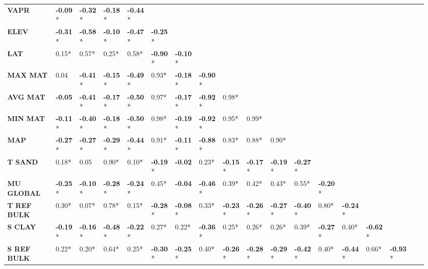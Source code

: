 \documentclass[AutoFakeBold]{LZUThesis-PgD&PhD}
\begin{document}
\begin{table}[H]
\begin{tabular}{p{1.6cm}p{0.68cm}p{0.68cm}p{0.68cm}p{0.68cm}p{0.68cm}p{0.68cm}p{0.68cm}p{0.68cm}p{0.68cm}p{0.68cm}p{0.68cm}p{0.68cm}p{0.68cm}p{0.68cm}p{0.68cm}p{0.68cm}p{0.68cm}}
			\textbf{VAPR} & \textbf{-0.09}* & \textbf{-0.32}* & \textbf{-0.18}* & \textbf{-0.44}* &  &  &  &  &  &  &  &  &  &  &  &  &  \\
			\textbf{ELEV} & \textbf{-0.31}* & \textbf{-0.58}* & \textbf{-0.10}* & \textbf{-0.47}* & \textbf{-0.25}* &  &  &  &  &  &  &  &  &  &  &  &  \\
			\textbf{LAT} & 0.15* & 0.57* & 0.25* & 0.58* & \textbf{-0.90}* & \textbf{-0.10}* &  &  &  &  &  &  &  &  &  &  &  \\
			\textbf{MAX MAT} & 0.04 & \textbf{-0.41}* & \textbf{-0.15}* & \textbf{-0.49}* & 0.93* & \textbf{-0.18}* & \textbf{-0.90}* &  &  &  &  &  &  &  &  &  &  \\
			\textbf{AVG MAT} & \textbf{-0.05} & \textbf{-0.41}* & \textbf{-0.17}* & \textbf{-0.50}* & 0.97* & \textbf{-0.17}* & \textbf{-0.92}* & 0.98* &  &  &  &  &  &  &  &  &  \\
			\textbf{MIN MAT} & \textbf{-0.11}* & \textbf{-0.40}* & \textbf{-0.18}* & \textbf{-0.50}* & 0.98* & \textbf{-0.19}* & \textbf{-0.92}* & 0.95* & 0.99* &  &  &  &  &  &  &  &  \\
			\textbf{MAP} & \textbf{-0.27}* & \textbf{-0.27}* & \textbf{-0.29}* & \textbf{-0.44}* & 0.91* & \textbf{-0.11}* & \textbf{-0.88}* & 0.83* & 0.88* & 0.90* &  &  &  &  &  &  &  \\
			\textbf{T SAND} & 0.18* & 0.05 & 0.90* & 0.10* & \textbf{-0.19}* & \textbf{-0.02} & 0.23* & \textbf{-0.15}* & \textbf{-0.17}* & \textbf{-0.19}* & \textbf{-0.27}* &  &  &  &  &  &  \\
			\textbf{MU GLOBAL} & \textbf{-0.25}* & \textbf{-0.10}* & \textbf{-0.28}* & \textbf{-0.24}* & 0.45* & \textbf{-0.04} & \textbf{-0.46}* & 0.39* & 0.42* & 0.43* & 0.55* & \textbf{-0.20}* &  &  &  &  &  \\
			\textbf{T REF BULK} & 0.30* & 0.07* & 0.78* & 0.15* & \textbf{-0.28}* & \textbf{-0.08}* & 0.33* & \textbf{-0.23}* & \textbf{-0.26}* & \textbf{-0.27}* & \textbf{-0.40}* & 0.80* & \textbf{-0.24}* &  &  &  &  \\
			\textbf{S CLAY} & \textbf{-0.19}* & \textbf{-0.16}* & \textbf{-0.48}* & \textbf{-0.22}* & 0.27* & 0.22* & \textbf{-0.36}* & 0.25* & 0.26* & 0.26* & 0.39* & \textbf{-0.27}* & 0.40* & \textbf{-0.62}* &  &  &  \\
			\textbf{S REF BULK} & 0.22* & 0.20* & 0.64* & 0.25* & \textbf{-0.30}* & \textbf{-0.25}* & 0.40* & \textbf{-0.26}* & \textbf{-0.28}* & \textbf{-0.29}* & \textbf{-0.42}* & 0.40* & \textbf{-0.44}* & 0.66* & \textbf{-0.93}* &  &  \\

\end{tabular}
\end{table}
\end{document}
